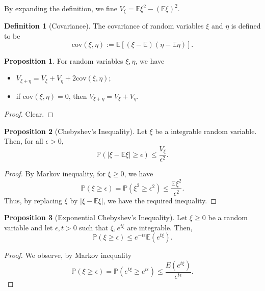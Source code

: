 \documentclass[]{article}
\theoremstyle{definition}
\theoremstyle{definition}
\newtheorem{definition}{Definition}[section]
\newtheorem{proposition}{Proposition}[section]
\begin{document}
By expanding the definition, we fine \(V_\xi = \mathbb{E}\xi^2 - (\mathbb{E}\xi)^2\).

\begin{definition}[Covariance]
  The covariance of random variables \(\xi\) and \(\eta\) is defined to be 
  \[\text{cov}(\xi, \eta) := \mathbb{E}[(\xi - \mathbb{E})(\eta - \mathbb{E}\eta)].\]
\end{definition}

\begin{proposition}
  For random variables \(\xi, \eta\), we have 
  \begin{itemize}
    \item \(V_{\xi + \eta} = V_\xi + V_\eta + 2 \text{cov}(\xi, \eta)\);
    \item if \(\text{cov}(\xi, \eta) = 0\), then \(V_{\xi + \eta} = V_\xi + V_\eta\).
  \end{itemize}
\end{proposition}
\begin{proof}
  Clear.
\end{proof}

\begin{proposition}[Chebyshev's Inequality]
  Let \(\xi\) be a integrable random variable. Then, for all \(\epsilon > 0\), 
  \[\mathbb{P}(|\xi - \mathbb{E}\xi| \ge \epsilon) \le \frac{V_\xi}{\epsilon^2}.\]
\end{proposition}
\begin{proof}
  By Markov inequality, for \(\xi \ge 0\), we have 
  \[\mathbb{P}(\xi \ge \epsilon) = \mathbb{P}(\xi^2 \ge \epsilon^2) \le \frac{\mathbb{E}\xi^2}{\epsilon^2}.\]
  Thus, by replacing \(\xi\) by \(|\xi - \mathbb{E}\xi|\), we have the required inequality. 
\end{proof}

\begin{proposition}[Exponential Chebyshev's Inequality]
  Let \(\xi \ge 0\) be a random variable and let \(\epsilon, t > 0\) such that \(\xi, e^{t\xi}\) are
  integrable. Then, 
  \[\mathbb{P}(\xi \ge \epsilon) \le e^{-t\epsilon} \mathbb{E}(e^{t\xi}).\]
\end{proposition}
\begin{proof}
  We observe, by Markov inequality 
  \[\mathbb{P}(\xi \ge \epsilon) = \mathbb{P}(e^{t\xi} \ge e^{t\epsilon}) \le \frac{E(e^{t\xi})}{e^{t\epsilon}}.\]
\end{proof}
\end{document}
